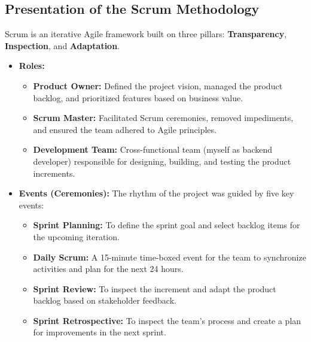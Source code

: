 \subsection{Presentation of the Scrum Methodology}
Scrum is an iterative Agile framework built on three pillars: \textbf{Transparency}, \textbf{Inspection}, and \textbf{Adaptation}.
\begin{itemize}
    \item \textbf{Roles:}
    \begin{itemize}
        \item \textbf{Product Owner:} Defined the project vision, managed the product backlog, and prioritized features based on business value.
        \item \textbf{Scrum Master:} Facilitated Scrum ceremonies, removed impediments, and ensured the team adhered to Agile principles.
        \item \textbf{Development Team:} Cross-functional team (myself as backend developer) responsible for designing, building, and testing the product increments.
    \end{itemize}
    \item \textbf{Events (Ceremonies):} The rhythm of the project was guided by five key events:
    \begin{itemize}
        \item \textbf{Sprint Planning:} To define the sprint goal and select backlog items for the upcoming iteration.
        \item \textbf{Daily Scrum:} A 15-minute time-boxed event for the team to synchronize activities and plan for the next 24 hours.
        \item \textbf{Sprint Review:} To inspect the increment and adapt the product backlog based on stakeholder feedback.
        \item \textbf{Sprint Retrospective:} To inspect the team's process and create a plan for improvements in the next sprint.
    \end{itemize}
\end{itemize}
